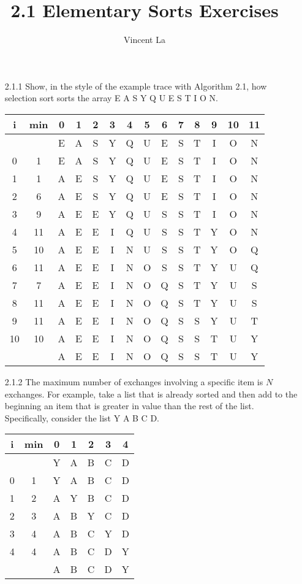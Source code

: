 \documentclass[]{article}
\title{2.1 Elementary Sorts Exercises}
\author{Vincent La}
\begin{document}
\maketitle

\begin{enumerate}
	\item[2.1.1] Show, in the style of the example trace with Algorithm 2.1, how selection sort sorts the array E A S Y Q U E S T I O N.
	
	\begin{tabular}{c c c c c c c c c c c c c c}
		i & min & 0 & 1 & 2 & 3 & 4 & 5 & 6 & 7 & 8 & 9 & 10 & 11\\
		\hline
		   &   & E & A & S & Y & Q & U & E & S & T & I & O & N \\
		0  & 1 & E & \color{red}A & S & Y & Q & U & E & S & T & I & O & N \\	
		1  & 1 & A & \color{red}E & S & Y & Q & U & E & S & T & I & O & N \\
		2  & 6 & A & E & S & Y & Q & U & \color{red}E & S & T & I & O & N \\
		3  & 9 & A & E & E & Y & Q & U & S & S & T & \color{red}I & O & N \\
		4  & 11 & A & E & E & I & Q & U & S & S & T & Y & O & \color{red}N \\
		5  & 10 & A & E & E & I & N & U & S & S & T & Y & \color{red}O & Q \\
		6  & 11 & A & E & E & I & N & O & S & S & T & Y & U & \color{red}Q \\
		7  & 7  & A & E & E & I & N & O & Q & \color{red}S & T & Y & U & S \\
		8  & 11 & A & E & E & I & N & O & Q & S & T & Y & U & \color{red}S \\
		9  & 11 & A & E & E & I & N & O & Q & S & S & Y & U & \color{red}T \\
		10 & 10 & A & E & E & I & N & O & Q & S & S & T & \color{red}U & Y \\
		   &    & A & E & E & I & N & O & Q & S & S & T & U & Y \\
	\end{tabular}
	
	\item[2.1.2] The maximum number of exchanges involving a specific item is $N$ exchanges. For example, take a list that is already sorted and then add to the beginning an item that is greater in value than the rest of the list. Specifically, consider the list Y A B C D.
	
	\begin{tabular}{c c c c c c c}
		i & min & 0 & 1 & 2 & 3 & 4 \\
		\hline
		  &     & Y & A & B & C & D \\
		0 & 1   & Y & \color{red}A & B & C & D \\
		1 & 2   & A & Y & \color{red}B & C & D \\
		2 & 3   & A & B & Y & \color{red}C & D \\
		3 & 4   & A & B & C & Y & \color{red}D \\
		4 & 4   & A & B & C & D & \color{red}Y \\
		  &     & A & B & C & D & Y \\
	\end{tabular}
	

\end{enumerate}
\end{document}
